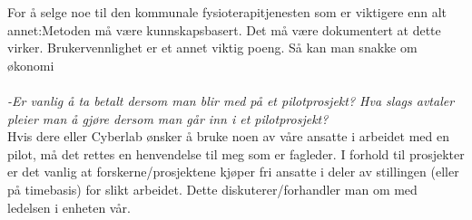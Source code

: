 For å selge noe til den kommunale fysioterapitjenesten som er viktigere enn alt annet:Metoden må være kunnskapsbasert. Det må være dokumentert at dette virker. Brukervennlighet er et annet viktig poeng. Så kan man snakke om økonomi \\ \\
\emph{-Er vanlig å ta betalt dersom man blir med på et pilotprosjekt? Hva slags avtaler pleier man å gjøre dersom man går inn i et pilotprosjekt?}\\ 
Hvis dere eller Cyberlab ønsker å bruke noen av våre ansatte i arbeidet med en pilot, må det rettes en henvendelse til meg som er fagleder. I forhold til prosjekter er det vanlig at forskerne/prosjektene kjøper fri ansatte i deler av stillingen (eller på timebasis) for slikt  arbeidet. Dette diskuterer/forhandler man om med ledelsen i enheten vår.

\newpage
